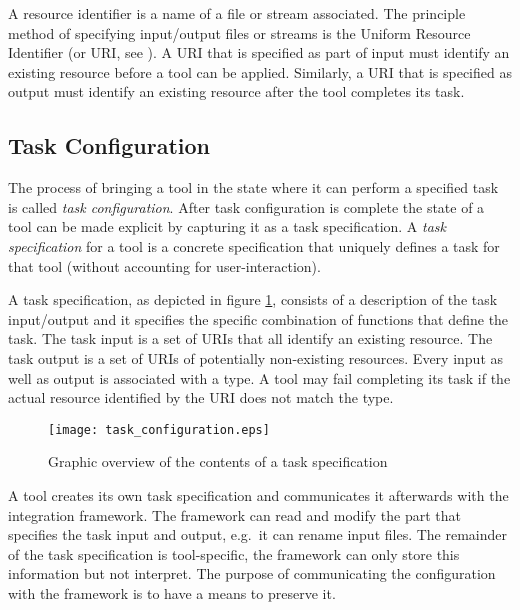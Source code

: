 \documentclass{article}
\begin{document}
   A resource identifier is a name of a file or stream associated.  The principle method of
   specifying input/output files or streams is the Uniform Resource Identifier
   (or URI, see \cite{rfc3305}). A URI that is specified as part of input must
   identify an existing resource before a tool can be applied. Similarly, a URI
   that is specified as output must identify an existing resource after the
   tool completes its task.

  \subsection{Task Configuration} \label{concepts::task_configuration}

   
   The process of bringing a tool in the state where it can perform a specified
   task is called \textit{task configuration}. After task configuration is
   complete the state of a tool can be made explicit by capturing it as a task
   specification.  A \textit{task specification} for a tool is a concrete
   specification that uniquely defines a task for that tool (without accounting
   for user-interaction).

   A task specification, as depicted in figure \ref{figure:task_specification},
   consists of a description of the task input/output and it specifies the
   specific combination of functions that define the task. The task input is a
   set of URIs that all identify an existing resource. The task output is a set
   of URIs of potentially non-existing resources. Every input as well as output
   is associated with a type. A tool may fail completing its task if the actual
   resource identified by the URI does not match the type.

   \begin{figure}[H]
    \begin{center}
     \texttt{[image: task\_configuration.eps]}
    \end{center}
    \caption{Graphic overview of the contents of a task specification}
    \label{figure:task_specification}
    \vspace{-0.4cm}
   \end{figure}

 
   A tool creates its own task specification and communicates it afterwards
   with the integration framework. The framework can read and modify the part
   that specifies the task input and output, e.g.\ it can rename input files.
   The remainder of the task specification is tool-specific, the framework can
   only store this information but not interpret. The purpose of communicating
   the configuration with the framework is to have a means to preserve it.
   
\end{document}
